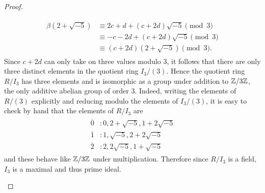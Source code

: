 \documentclass[10pt]{amsart}
\begin{document}
\begin{thm}
\begin{proof}
\begin{alphaenum}
\begin{align*}
        \begin{split}
          \beta(2 + \sqrt{-5}) &\equiv 2c + d + (c + 2d)\sqrt{-5} \pmod{3}\\
          &\equiv -c - 2d + (c + 2d)\sqrt{-5} \pmod{3}\\
          &\equiv (c+2d)(2 + \sqrt{-5}) \pmod{3}.
        \end{split}
      \end{align*}
      Since $c+2d$ can only take on three values modulo 3, it follows that there are only three distinct elements in the quotient ring $I_3/(3)$.
      Hence the quotient ring $R/I_3$ has three elements and is isomorphic as a group under addition to $\mathbb{Z}/3\mathbb{Z}$, the only additive abelian group of order 3.
      Indeed, writing the elements of $R/(3)$ explicitly and reducing modulo the elements of $I_3/(3)$, it is easy to check by hand that the elements of $R/I_3$ are
      \begin{align*}
        \begin{split}
          \overline{0}&: 0, 2+\sqrt{-5}, 1 + 2\sqrt{-5}\\
          \overline{1}&: 1, \sqrt{-5}, 2 + 2\sqrt{-5}\\
          \overline{2}&: 2, 2\sqrt{-5}, 1 + \sqrt{-5}
        \end{split}
      \end{align*}
      and these behave like $\mathbb{Z}/3\mathbb{Z}$ under multiplication.
      Therefore since $R/I_3$ is a field, $I_3$ is a maximal and thus prime ideal.
      

\end{alphaenum}
\end{proof}
\end{thm}
\end{document}
